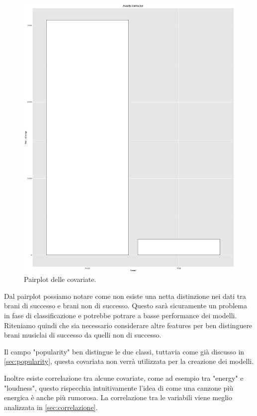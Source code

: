 \begin{figure}[H]
	\centering
	\includegraphics[width=19cm, angle=270]{../images/pairplot.png}
	\caption{Pairplot delle covariate.}
\end{figure}

Dal pairplot possiamo notare come non esiste una netta distinzione nei dati tra brani di successo e brani non di successo. Questo sarà sicuramente un problema in fase di classificazione e potrebbe potrare a basse performance dei modelli. Riteniamo quindi che sia necessario considerare altre features per ben distinguere brani musiclai di successo da quelli non di successo.

Il campo "popularity" ben distingue le due classi, tuttavia come già discusso in \autoref{sec:popularity}, questa covariata non verrà utilizzata per la creazione dei modelli.

Inoltre esiste correlazione tra alcune covariate, come ad esempio tra "energy" e "loudness", questo rispecchia intuitivamente l'idea di come una canzone più energica è anche più rumorosa. La correlazione tra le variabili viene meglio analizzata in \autoref{sec:correlazione}.

